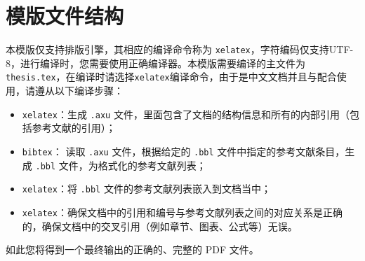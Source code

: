 \section{模版文件结构}

本模版仅支持排版引擎，其相应的编译命令称为 \texttt{xelatex}，字符编码仅支持UTF-8，进行编译时，您需要使用正确编译器。本模版需要编译的主文件为\texttt{thesis.tex}，在编译时请选择\texttt{xelatex}编译命令，由于是中文文档并且与配合使用，请遵从以下编译步骤：

\begin{itemize}
    \item \texttt{xelatex}：生成 \texttt{.axu} 文件，里面包含了文档的结构信息和所有的内部引用（包括参考文献的引用）；
    \item \texttt{bibtex}： 读取 \texttt{.axu} 文件，根据给定的 \texttt{.bbl}  文件中指定的参考文献条目，生成 \texttt{.bbl} 文件，为格式化的参考文献列表；
    \item \texttt{xelatex}：将 \texttt{.bbl} 文件的参考文献列表嵌入到文档当中；
    \item \texttt{xelatex}：确保文档中的引用和编号与参考文献列表之间的对应关系是正确的，确保文档中的交叉引用（例如章节、图表、公式等）无误。
\end{itemize}
如此您将得到一个最终输出的正确的、完整的 PDF 文件。

